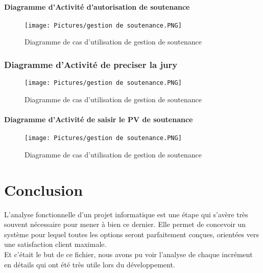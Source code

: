 \documentclass[11pt,fleqn]{book} %
\begin{document}
\subsubsection{Diagramme d'Activité d'autorisation de soutenance}
\begin{figure}[h]
    \centering
    \texttt{[image: Pictures/gestion de soutenance.PNG]}
    \caption{Diagramme de cas d'utilisation de gestion de soutenance}
    \label{fig:pca}
\end{figure}
\newpage
\subsection{Diagramme d'Activité de preciser la jury}
\begin{figure}[h]
    \centering
    \texttt{[image: Pictures/gestion de soutenance.PNG]}
    \caption{Diagramme de cas d'utilisation de gestion de soutenance}
    \label{fig:pca}
\end{figure}
\newpage
\subsubsection{Diagramme d'Activité de saisir le PV de soutenance}
\begin{figure}[h]
    \centering
    \texttt{[image: Pictures/gestion de soutenance.PNG]}
    \caption{Diagramme de cas d'utilisation de gestion de soutenance}
    \label{fig:pca}
\end{figure}
\chapter{Conclusion}
L'analyse fonctionnelle d'un projet informatique est une étape qui s'avère très souvent nécessaire pour mener à bien ce dernier. Elle permet de concevoir un système pour 
lequel toutes les options seront parfaitement conçues, orientées vers une satisfaction 
client maximale.  \\
Et c’était le but de ce fichier, nous avons pu voir l’analyse de chaque incrément en détails qui ont été très utile lors du développement.
\listoffigures
\end{document}
